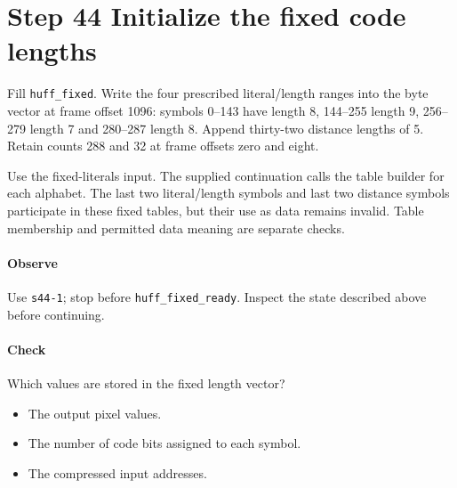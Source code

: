\section{Step 44 Initialize the fixed code lengths}\label{png-huff-s44}
Fill \texttt{huff\_fixed}. Write the four prescribed literal/length ranges into the byte vector at frame offset 1096: symbols 0--143 have length 8, 144--255 length 9, 256--279 length 7 and 280--287 length 8. Append thirty-two distance lengths of 5. Retain counts 288 and 32 at frame offsets zero and eight.

Use the fixed-literals input. The supplied continuation calls the table builder for each alphabet. The last two literal/length symbols and last two distance symbols participate in these fixed tables, but their use as data remains invalid. Table membership and permitted data meaning are separate checks.

\paragraph{Observe} Use \texttt{s44-1}; stop before \texttt{huff\_fixed\_ready}. Inspect the state described above before continuing.

\paragraph{Check} Which values are stored in the fixed length vector?
\begin{itemize}
\item[A.] The output pixel values.
\item[B.] The number of code bits assigned to each symbol.
\item[C.] The compressed input addresses.
\end{itemize}
